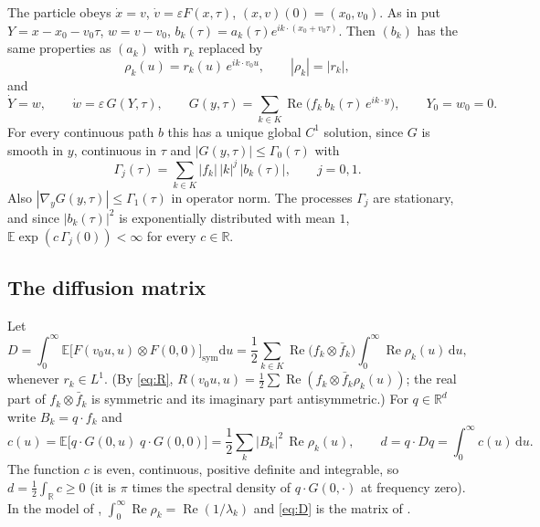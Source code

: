 \documentclass[11pt]{article}
\newcommand{\dd}{\mathrm{d}}
\newcommand{\E}{\mathbb{E}}
\newcommand{\eps}{\varepsilon}
\renewcommand{\Re}{\operatorname{Re}}
\theoremstyle{remark}
\begin{document}
The particle obeys $\dot x = v$, $\dot v = \eps F(x,\tau)$,
$(x,v)(0) = (x_0,v_0)$. As in \cite{Note} put $Y = x-x_0-v_0\tau$,
$w = v-v_0$, $b_k(\tau) = a_k(\tau)e^{ik\cdot(x_0+v_0\tau)}$. Then $(b_k)$
has the same properties as $(a_k)$ with $r_k$ replaced by
\begin{equation}
  \rho_k(u) = r_k(u)\,e^{ik\cdot v_0u}, \qquad |\rho_k| = |r_k| ,
\end{equation}
and
\begin{equation}
  \dot Y = w,\qquad \dot w = \eps\,G(Y,\tau),\qquad
  G(y,\tau) = \sum_{k\in K}\Re\bigl(f_k\,b_k(\tau)\,e^{ik\cdot y}\bigr),
  \qquad Y_0 = w_0 = 0 .
  \label{eq:Yw}
\end{equation}
For every continuous path $b$ this has a unique global $C^1$ solution, since
$G$ is smooth in $y$, continuous in $\tau$ and $|G(y,\tau)|\le\Gamma_0(\tau)$
with
\begin{equation}
  \Gamma_j(\tau) = \sum_{k\in K}|f_k|\,|k|^j\,|b_k(\tau)|, \qquad j = 0,1 .
\end{equation}
Also $|\nabla_yG(y,\tau)|\le\Gamma_1(\tau)$ in operator norm. The processes
$\Gamma_j$ are stationary, and since $|b_k(\tau)|^2$ is exponentially
distributed with mean $1$, $\E\exp(c\,\Gamma_j(0))<\infty$ for every
$c\in\mathbb{R}$.

\subsection{The diffusion matrix}

Let
\begin{equation}
  D = \int_0^\infty \E\bigl[F(v_0u,u)\otimes F(0,0)\bigr]_{\mathrm{sym}}\dd u
    = \frac12\sum_{k\in K}\Re\bigl(f_k\otimes\bar f_k\bigr)
      \int_0^\infty\Re\rho_k(u)\,\dd u ,
  \label{eq:D}
\end{equation}
whenever $r_k\in L^1$. (By \eqref{eq:R},
$R(v_0u,u) = \frac12\sum\Re(f_k\otimes\bar f_k\rho_k(u))$; the real part of
$f_k\otimes\bar f_k$ is symmetric and its imaginary part antisymmetric.) For
$q\in\mathbb{R}^d$ write $B_k = q\cdot f_k$ and
\begin{equation}
  c(u) = \E\bigl[q\cdot G(0,u)\;q\cdot G(0,0)\bigr]
       = \frac12\sum_k|B_k|^2\,\Re\rho_k(u),
  \qquad d = q\cdot Dq = \int_0^\infty c(u)\,\dd u .
\end{equation}
The function $c$ is even, continuous, positive definite and integrable, so
$d = \frac12\int_{\mathbb{R}}c\ge0$ (it is $\pi$ times the spectral density
of $q\cdot G(0,\cdot)$ at frequency zero). In the model of \cite{Note},
$\int_0^\infty\Re\rho_k = \Re(1/\lambda_k)$ and \eqref{eq:D} is the matrix
of \cite{Note}.
\end{document}
